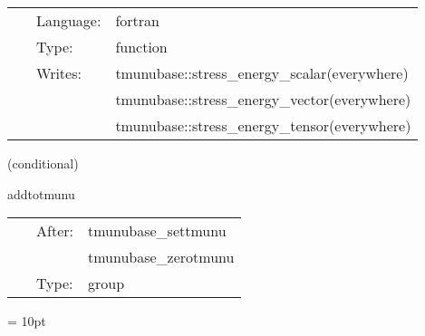 \hspace{5mm}{\it initialise the stress-energy tensor to zero } 


\hspace{5mm}

 \begin{tabular*}{160mm}{cll} 
~ & Language:  & fortran \\ 
~ & Type:  & function \\ 
~ & Writes:  & tmunubase::stress\_energy\_scalar(everywhere) \\ 
~& ~ &tmunubase::stress\_energy\_vector(everywhere)\\ 
~& ~ &tmunubase::stress\_energy\_tensor(everywhere)\\ 
\end{tabular*} 


\vspace{5mm}

   (conditional) 

\hspace{5mm} addtotmunu 

\hspace{5mm}{\it add to the stress-energy tensor here } 


\hspace{5mm}

 \begin{tabular*}{160mm}{cll} 
~ & After:  & tmunubase\_settmunu \\ 
~& ~ &tmunubase\_zerotmunu\\ 
~ & Type:  & group \\ 
\end{tabular*} 



\vspace{5mm}\parskip = 10pt 
